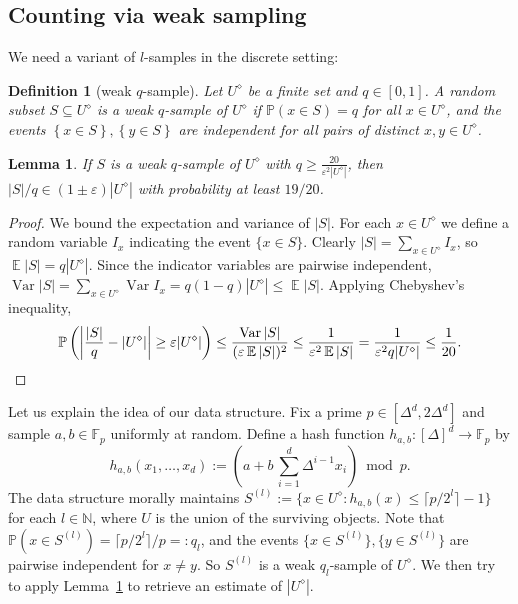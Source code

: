 \documentclass[11pt]{article}
\def\Natural{\mathbb{N}}
\let\N\Natural
\def\E{\operatorname{\mathbb{E}}}		%
\def\Var{\operatorname{Var}}
\def\set#1{\left\{ #1 \right\}}
\def\card#1{\left\lvert #1 \right\rvert}		%
\newtheorem{lemma}[theorem]{Lemma}
\newtheorem{definition}[theorem]{Definition}
\newcommand{\F}{\mathbb{F}}
\newcommand{\eps}{\varepsilon}
\renewcommand{\Pr}{\mathbb{P}}
\newcommand{\discrete}[1]{#1^\diamond}
\def\aftermath{\par\vspace{-\belowdisplayskip}\vspace{-\baselineskip}}
\begin{document}
\subsection{Counting via weak sampling}
We need a variant of $l$-samples in the discrete setting:
\begin{definition}[weak $q$-sample]
    Let $\discrete{U}$ be a finite set and $q \in [0,1]$. A random subset $S \subseteq \discrete{U}$ is a \emph{weak $q$-sample} of $\discrete{U}$ if $\Pr(x \in S) = q$ for all $x \in \discrete{U}$, and the events $\set{x \in S}, \set{y \in S}$ are independent for all pairs of distinct $x,y \in \discrete{U}$.
\end{definition}
%
\begin{lemma}
    \label{lem:weak-sample}
    If $S$ is a weak $q$-sample of $\discrete{U}$ with $q \geq \frac{20}{\eps^2 |\discrete{U}|}$, then $|S|/q \in (1 \pm \eps) |\discrete{U}|$ with probability at least $19/20$.
\end{lemma}
%
\begin{proof}
    We bound the expectation and variance of $|S|$. For each $x \in \discrete{U}$ we define a random variable $I_x$ indicating the event $\{x \in S\}$. Clearly $|S| = \sum_{x \in \discrete{U}} I_x$, so $\E |S| = q|\discrete{U}|$. Since the indicator variables are pairwise independent, $\Var |S| = \sum_{x \in \discrete{U}} \Var I_x = q(1-q) |\discrete{U}| \leq \E |S|$. Applying Chebyshev's inequality,
    \[
        \Pr \left( \card{\frac{|S|}{q} - |\discrete{U}|} \geq \eps |\discrete{U}| \right)
        \leq \frac{\Var |S|}{(\eps \E |S|)^2}
        \leq \frac{1}{\eps^2 \E |S|}
        = \frac{1}{\eps^2 q|\discrete{U}|}
        \leq \frac{1}{20}. \qedhere
    \]
    \aftermath
\end{proof}
%
Let us explain the idea of our data structure. Fix a prime $p \in [\Delta^d, 2 \Delta^d]$ and sample $a,b \in \F_p$ uniformly at random. Define a hash function $h_{a,b}: [\Delta]^d \to \F_p$ by
\[ h_{a,b}(x_1, \dots, x_d) := \left( a + b\,\sum_{i=1}^d \Delta^{i-1} x_i \right) \bmod p. \]
The data structure morally maintains $S^{(l)} := \{x \in \discrete{U} : h_{a,b}(x) \leq \lceil p/2^l \rceil-1\}$ for each $l \in \N$, where $U$ is the union of the surviving objects. Note that $\Pr(x \in S^{(l)}) = \lceil p/2^l\rceil / p =: q_l$, and the events $\{x \in S^{(l)}\}, \{y \in S^{(l)}\}$ are pairwise independent for $x \neq y$. So $S^{(l)}$ is a weak $q_l$-sample of $\discrete{U}$. We then try to apply Lemma~\ref{lem:weak-sample} to retrieve an estimate of $|\discrete{U}|$.
%
\end{document}

